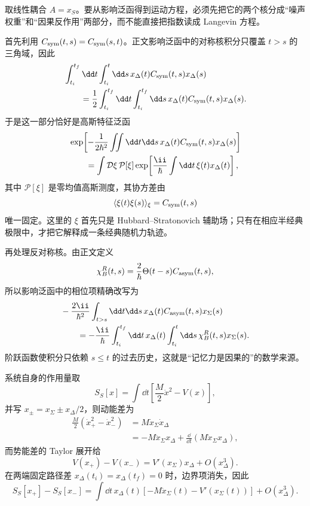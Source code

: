 \begin{derivation}[影响泛函中的随机力与因果反作用]
取线性耦合 $A=x_S$。要从影响泛函得到运动方程，必须先把它的两个核分成“噪声权重”和“因果反作用”两部分，而不能直接把指数读成 Langevin 方程。

首先利用 $C_{\rm sym}(t,s)=C_{\rm sym}(s,t)$。正文影响泛函中的对称核积分只覆盖 $t>s$ 的三角域，因此
\begin{align*}
 &\int_{t_i}^{t_f}\dd t\int_{t_i}^{t}\dd s\,
 x_\Delta(t)C_{\rm sym}(t,s)x_\Delta(s)\\
 &\qquad=\frac12
 \int_{t_i}^{t_f}\dd t\int_{t_i}^{t_f}\dd s\,
 x_\Delta(t)C_{\rm sym}(t,s)x_\Delta(s).
\end{align*}
于是这一部分恰好是高斯特征泛函
\begin{align*}
 &\exp\!\left[-\frac{1}{2\hbar^2}
 \iint\dd t\dd s\,
 x_\Delta(t)C_{\rm sym}(t,s)x_\Delta(s)\right]\\
 &\qquad=
 \int\mathcal D\xi\,\mathcal P[\xi]
 \exp\!\left[\frac{\ii}{\hbar}
 \int\dd t\,\xi(t)x_\Delta(t)\right],
\end{align*}
其中 $\mathcal P[\xi]$ 是零均值高斯测度，其协方差由
\begin{equation*}
 \langle\xi(t)\xi(s)\rangle_\xi=C_{\rm sym}(t,s)
\end{equation*}
唯一固定。这里的 $\xi$ 首先只是 Hubbard--Stratonovich 辅助场；只有在相应半经典极限中，才把它解释成一条经典随机力轨迹。

再处理反对称核。由正文定义
\begin{equation*}
 \chi_B^R(t,s)
 =\frac{2}{\hbar}\Theta(t-s)C_{\rm asym}(t,s),
\end{equation*}
所以影响泛函中的相位项精确改写为
\begin{align*}
 &-\frac{2\ii}{\hbar^2}
 \int_{t>s}\dd t\dd s\,
 x_\Delta(t)C_{\rm asym}(t,s)x_\Sigma(s)\\
 &\qquad=-\frac{\ii}{\hbar}
 \int_{t_i}^{t_f}\dd t\,x_\Delta(t)
 \int_{t_i}^{t}\dd s\,
 \chi_B^R(t,s)x_\Sigma(s).
\end{align*}
阶跃函数使积分只依赖 $s\le t$ 的过去历史，这就是“记忆力是因果的”的数学来源。

系统自身的作用量取
\begin{equation*}
 S_S[x]=\int\dd t\left[\frac{M}{2}\dot x^2-V(x)\right],
\end{equation*}
并写 $x_\pm=x_\Sigma\pm x_\Delta/2$，则动能差为
\begin{align*}
 \frac{M}{2}(\dot x_+^2-\dot x_-^2)
 &=M\dot x_\Sigma\dot x_\Delta\\
 &=-M\ddot x_\Sigma x_\Delta
 +\frac{\dd}{\dd t}(M\dot x_\Sigma x_\Delta),
\end{align*}
而势能差的 Taylor 展开给
\begin{equation*}
 V(x_+)-V(x_-)
 =V'(x_\Sigma)x_\Delta+O(x_\Delta^3).
\end{equation*}
在两端固定路径差 $x_\Delta(t_i)=x_\Delta(t_f)=0$ 时，边界项消失，因此
\begin{equation*}
 S_S[x_+]-S_S[x_-]
 =\int\dd t\,x_\Delta(t)
 [-M\ddot x_\Sigma(t)-V'(x_\Sigma(t))]
 +O(x_\Delta^3).
\end{equation*}


\end{derivation}

